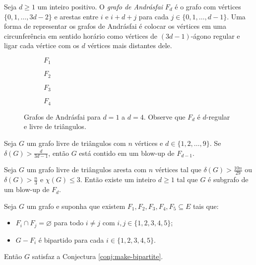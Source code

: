 \begin{definition}
  Seja $d \geq 1$ um inteiro positivo.
  O \emph{grafo de Andrásfai} $F_d$ é o grafo com vértices $\{0,1,\dots,3d-2\}$ e arestas entre $i$ e $i+d+j$ para cada $j \in \{0,1,\dots,d-1\}$.
  Uma forma de representar os grafos de Andrásfai é colocar os vértices em uma circunferência em sentido horário como vértices de $(3d-1)$-ágono regular e ligar cada vértice com os $d$ vértices mais distantes dele.

  \begin{figure}[htbp]
    \centering

    \begin{subfigure}[b]{0.22\textwidth}
      \centering
      \caption*{$F_1$}
    \end{subfigure}
    \hfill
    \begin{subfigure}[b]{0.22\textwidth}
      \centering
      \caption*{$F_2$}
    \end{subfigure}
    \hfill
    \begin{subfigure}[b]{0.22\textwidth}
      \centering
      \caption*{$F_3$}
    \end{subfigure}
    \hfill
    \begin{subfigure}[b]{0.22\textwidth}
      \centering
      \caption*{$F_4$}
    \end{subfigure}

    \caption{Grafos de Andrásfai para $d = 1$ a $d = 4$. Observe que $F_d$ é $d$-regular e livre de triângulos.}
  \end{figure}
\end{definition}

\begin{theorem}
  Seja $G$ um grafo livre de triângulos com $n$ vértices e $d \in \{1,2,\dots,9\}$.
  Se $\delta(G) > \frac{d}{3d-1}$, então $G$ está contido em um blow-up de $F_{d-1}$.
\end{theorem}

\begin{theorem}
  Seja $G$ um grafo livre de triângulos aresta com $n$ vértices tal que $\delta(G) > \frac{10n}{29}$ ou $\delta(G) > \frac{n}{3}$ e $\chi(G) \leq 3$.
  Então existe um inteiro $d \geq 1$ tal que $G$ é subgrafo de um blow-up de $F_d$.
\end{theorem}

\renewcommand{\emptyset}{\varnothing}

\begin{lemma}
  Seja $G$ um grafo e suponha que existem $F_1,F_2,F_3,F_4,F_5 \subseteq E$ tais que:
  \begin{itemize}
    \item $F_i \cap F_j = \emptyset$ para todo $i \neq j$ com $i,j \in \{1,2,3,4,5\}$;
    \item $G-F_i$ é bipartido para cada $i \in \{1,2,3,4,5\}$.
  \end{itemize}
  Então $G$ satisfaz a Conjectura \ref{conj:make-bipartite}.
\end{lemma}

